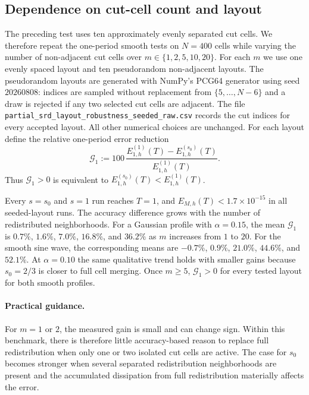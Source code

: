 \documentclass[preprint,12pt]{elsarticle}
\begin{document}
\subsection{Dependence on cut-cell count and layout}

The preceding test uses ten approximately evenly separated cut cells.  We
therefore repeat the one-period smooth tests on $N=400$ cells while varying
the number of non-adjacent cut cells over
$m\in\{1,2,5,10,20\}$.  For each $m$ we use one evenly spaced layout and ten pseudorandom non-adjacent layouts.
The pseudorandom layouts are generated with NumPy's PCG64 generator using seed
$20260808$: indices are sampled without replacement from
$\{5,\ldots,N-6\}$ and a draw is rejected if any two selected cut cells are
adjacent.  The file \texttt{partial\_srd\_layout\_robustness\_seeded\_raw.csv}
records the cut indices for every accepted layout.  All other numerical choices are unchanged.
For each layout define the relative one-period error reduction
\begin{equation}
    \mathcal G_1
    :=100\,\frac{E_{1,h}^{(1)}(T)-E_{1,h}^{(s_0)}(T)}
                   {E_{1,h}^{(1)}(T)}.
    \label{eq:calG1}
\end{equation}
Thus $\mathcal G_1>0$ is equivalent to
$E_{1,h}^{(s_0)}(T)<E_{1,h}^{(1)}(T)$.

Every $s=s_0$ and $s=1$ run reaches $T=1$, and
$E_{M,h}(T)<1.7\times10^{-15}$ in all seeded-layout runs.  The accuracy
difference grows with the number of redistributed neighborhoods.  For a
Gaussian profile with $\alpha=0.15$, the mean $\mathcal G_1$ is $0.7\%$, $1.6\%$, $7.0\%$, $16.8\%$, and $36.2\%$ as $m$
increases from $1$ to $20$.  For the smooth sine wave, the corresponding
means are $-0.7\%$, $0.9\%$, $21.0\%$, $44.6\%$, and $52.1\%$.  At
$\alpha=0.10$ the same qualitative trend holds with smaller gains because
$s_0=2/3$ is closer to full cell merging.  Once $m\ge5$, $\mathcal G_1>0$
for every tested layout for both smooth profiles.

\paragraph{Practical guidance.}
For $m=1$ or $2$, the measured gain is small and can change sign.  Within this
benchmark, there is therefore little accuracy-based reason to replace full
redistribution when only one or two isolated cut cells are active.  The case
for $s_0$ becomes stronger when several separated redistribution
neighborhoods are present and the accumulated dissipation from full
redistribution materially affects the error.
\end{document}
